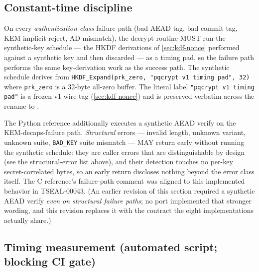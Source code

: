 \subsection{Constant-time discipline}

On every \emph{authentication-class} failure path (bad AEAD tag, bad commit tag, KEM implicit-reject, AD mismatch), the decrypt routine MUST run the synthetic-key schedule --- the HKDF derivations of \cref{sec:kdf-nonce} performed against a synthetic key and then discarded --- as a timing pad, so the failure path performs the same key-derivation work as the success path. The synthetic schedule derives from \texttt{HKDF\_Expand(prk\_zero, "pqcrypt v1 timing pad", 32)} where \texttt{prk\_zero} is a 32-byte all-zero buffer.
The literal label \texttt{"pqcrypt v1 timing pad"} is a frozen v1 wire tag (\cref{sec:kdf-nonce}) and is preserved verbatim across the rename to \pqcrypt{}.

The Python reference additionally executes a synthetic AEAD verify on the KEM-decaps-failure path. \emph{Structural} errors --- invalid length, unknown variant, unknown suite, \texttt{BAD\_KEY} suite mismatch --- MAY return early without running the synthetic schedule: they are caller errors that are distinguishable by design (see the structural-error list above), and their detection touches no per-key secret-correlated bytes, so an early return discloses nothing beyond the error class itself. The C reference's failure-path comment was aligned to this implemented behavior in TSEAL-00043. (An earlier revision of this section required a synthetic AEAD verify \emph{even on structural failure paths}; no port implemented that stronger wording, and this revision replaces it with the contract the eight implementations actually share.)

\subsection{Timing measurement (automated script; blocking CI gate)}

